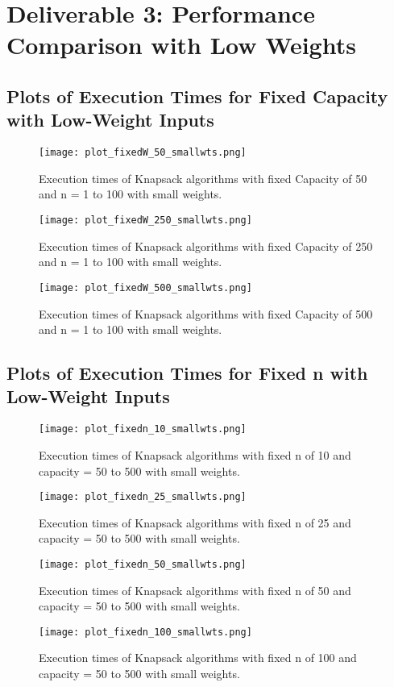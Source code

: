 \documentclass{article}
\begin{document}
\newpage
\section{Deliverable 3: Performance Comparison with Low Weights}
\subsection{Plots of Execution Times for Fixed Capacity with Low-Weight Inputs}

\begin{figure}[h!]
    \centering
    \texttt{[image: plot\_fixedW\_50\_smallwts.png]}
    \caption{Execution times of Knapsack algorithms with fixed Capacity of 50 and n = 1 to 100 with small weights.}
\end{figure}

\begin{figure}[h!]
    \centering
    \texttt{[image: plot\_fixedW\_250\_smallwts.png]}
    \caption{Execution times of Knapsack algorithms with fixed Capacity of 250 and n = 1 to 100 with small weights.}
\end{figure}

\begin{figure}[h!]
    \centering
    \texttt{[image: plot\_fixedW\_500\_smallwts.png]}
    \caption{Execution times of Knapsack algorithms with fixed Capacity of 500 and n = 1 to 100 with small weights.}
\end{figure}
\newpage
\subsection{Plots of Execution Times for Fixed n with Low-Weight Inputs}

\begin{figure}[hbt!]
    \centering
    \texttt{[image: plot\_fixedn\_10\_smallwts.png]}
    \caption{Execution times of Knapsack algorithms with fixed n of 10 and capacity = 50 to 500 with small weights.}
\end{figure}
\newpage
\begin{figure}[h!]
    \centering
    \texttt{[image: plot\_fixedn\_25\_smallwts.png]}
    \caption{Execution times of Knapsack algorithms with fixed n of 25 and capacity = 50 to 500 with small weights.}
\end{figure}

\begin{figure}[h!]
    \centering
    \texttt{[image: plot\_fixedn\_50\_smallwts.png]}
    \caption{Execution times of Knapsack algorithms with fixed n of 50 and capacity = 50 to 500 with small weights.}
\end{figure}
\newpage
\begin{figure}[h!]
    \centering
    \texttt{[image: plot\_fixedn\_100\_smallwts.png]}
    \caption{Execution times of Knapsack algorithms with fixed n of 100 and capacity = 50 to 500 with small weights.}
\end{figure}
\end{document}
